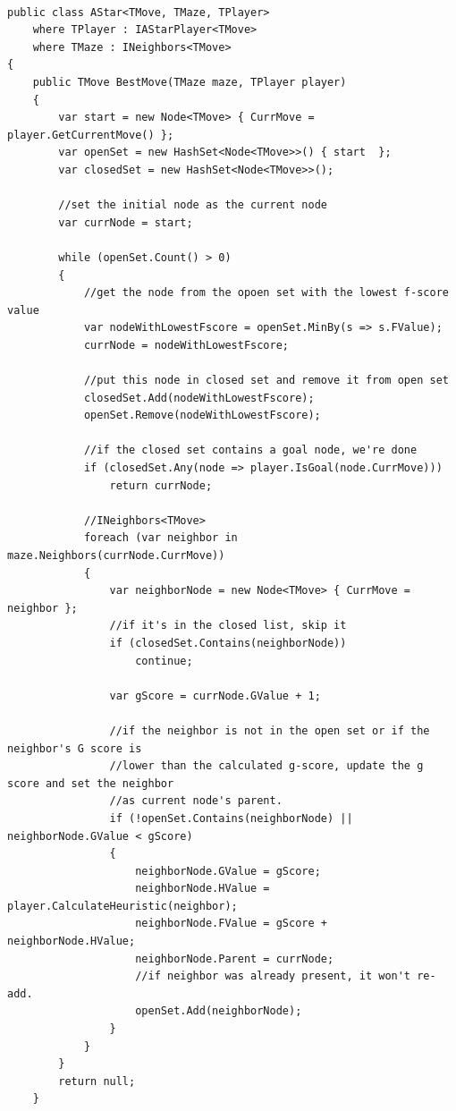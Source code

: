 \begin{lstlisting}

public class AStar<TMove, TMaze, TPlayer>
    where TPlayer : IAStarPlayer<TMove>
    where TMaze : INeighbors<TMove>
{
    public TMove BestMove(TMaze maze, TPlayer player)
    {
        var start = new Node<TMove> { CurrMove = player.GetCurrentMove() };
        var openSet = new HashSet<Node<TMove>>() { start  };
        var closedSet = new HashSet<Node<TMove>>();

        //set the initial node as the current node
        var currNode = start;

        while (openSet.Count() > 0)
        {
            //get the node from the opoen set with the lowest f-score value
            var nodeWithLowestFscore = openSet.MinBy(s => s.FValue);
            currNode = nodeWithLowestFscore;

            //put this node in closed set and remove it from open set
            closedSet.Add(nodeWithLowestFscore);
            openSet.Remove(nodeWithLowestFscore);

            //if the closed set contains a goal node, we're done
            if (closedSet.Any(node => player.IsGoal(node.CurrMove)))
                return currNode;

            //INeighbors<TMove>
            foreach (var neighbor in maze.Neighbors(currNode.CurrMove))
            {
                var neighborNode = new Node<TMove> { CurrMove = neighbor };
                //if it's in the closed list, skip it
                if (closedSet.Contains(neighborNode))
                    continue;

                var gScore = currNode.GValue + 1;

                //if the neighbor is not in the open set or if the neighbor's G score is
                //lower than the calculated g-score, update the g score and set the neighbor
                //as current node's parent.
                if (!openSet.Contains(neighborNode) || neighborNode.GValue < gScore)
                {
                    neighborNode.GValue = gScore;
                    neighborNode.HValue = player.CalculateHeuristic(neighbor);
                    neighborNode.FValue = gScore + neighborNode.HValue;
                    neighborNode.Parent = currNode;
                    //if neighbor was already present, it won't re-add.
                    openSet.Add(neighborNode);
                }
            }
        }
        return null;
    }

\end{lstlisting}

